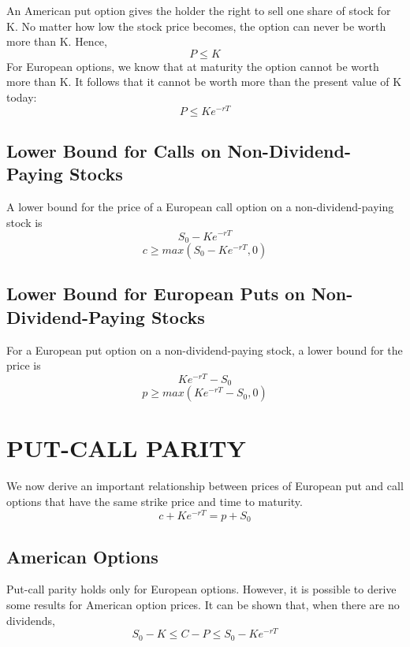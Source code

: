 \documentclass{article}
\begin{document}
An American put option gives the holder the right to sell one share of stock for K. No matter how low the stock price becomes, the option can never be worth more than K. Hence,
\begin{equation}
	P\le K
\end{equation}
For European options, we know that at maturity the option cannot be worth more than K. It follows that it cannot be worth more than the present value of K today:
\begin{equation}
	P\le Ke^{-rT}
\end{equation}

\subsection{Lower Bound for Calls on Non-Dividend-Paying Stocks}
A lower bound for the price of a European call option on a non-dividend-paying stock is
\[
S_0-Ke^{-rT}
\]
\begin{equation}
	c\ge max(S_0-Ke^{-rT},0)
\end{equation}
\subsection{Lower Bound for European Puts on Non-Dividend-Paying Stocks}
For a European put option on a non-dividend-paying stock, a lower bound for the price is
\[
Ke^{-rT}-S_0
\]
\begin{equation}
	p\ge max(Ke^{-rT}-S_0,0)
\end{equation}
\section{PUT-CALL PARITY}
We now derive an important relationship between prices of European put and call options that have the same strike price and time to maturity.
\begin{equation}
	c+Ke^{-rT}=p+S_0
\end{equation}

\subsection{American Options}
Put-call parity holds only for European options. However, it is possible to derive some results for American option prices. It can be shown that, when there are no dividends,
\begin{equation}
	S_0-K\le C-P\le S_0-Ke^{-rT}
\end{equation}
\end{document}
